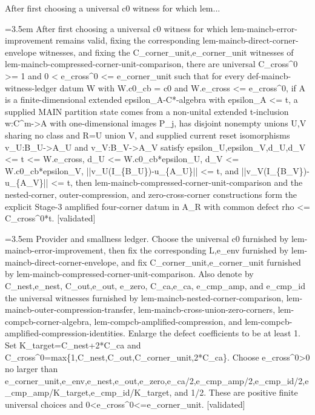 \documentclass{article}
\newcommand{\step}[1]{\par\noindent\hangindent=3.5em\hangafter=1%
  \makebox[3.5em][l]{\textbf{#1.}}}
\newcommand{\steptag}[1]{\hfill{\small\textsf{[#1]}}}
\begin{document}
\begin{proofbox}{After first choosing a universal c0 witness for which lem...}
\step{1} After first choosing a universal c0 witness for which lem-maincb-error-improvement remains valid, fixing the corresponding lem-maincb-direct-corner-envelope witnesses, and fixing the C\_corner\_unit,e\_corner\_unit witnesses of lem-maincb-compressed-corner-unit-comparison, there are universal C\_cross\textasciicircum{}0 >= 1 and 0 < e\_cross\textasciicircum{}0 <= e\_corner\_unit such that for every def-maincb-witness-ledger datum W with W.c0\_cb = c0 and W.e\_cross <= e\_cross\textasciicircum{}0, if A is a finite-dimensional extended epsilon\_A-C*-algebra with epsilon\_A <= t, a supplied MAIN partition state comes from a non-unital extended t-inclusion w:C\textasciicircum{}m->A with one-dimensional images P\_j, has disjoint nonempty unions U,V sharing no class and R=U union V, and supplied current reset isomorphisms v\_U:B\_U->A\_U and v\_V:B\_V->A\_V satisfy epsilon\_U,epsilon\_V,d\_U,d\_V <= t <= W.e\_cross, d\_U <= W.c0\_cb*epsilon\_U, d\_V <= W.c0\_cb*epsilon\_V, ||v\_U(I\_\{B\_U\})-u\_\{A\_U\}|| <= t, and ||v\_V(I\_\{B\_V\})-u\_\{A\_V\}|| <= t, then lem-maincb-compressed-corner-unit-comparison and the nested-corner, outer-compression, and zero-cross-corner constructions form the explicit Stage-3 amplified four-corner datum in A\_R with common defect rho <= C\_cross\textasciicircum{}0*t. \steptag{validated} \\[6pt]
\step{1.1} Provider and smallness ledger. Choose the universal c0 furnished by lem-maincb-error-improvement, then fix the corresponding L,e\_env furnished by lem-maincb-direct-corner-envelope, and fix C\_corner\_unit,e\_corner\_unit furnished by lem-maincb-compressed-corner-unit-comparison. Also denote by C\_nest,e\_nest, C\_out,e\_out, e\_zero, C\_ca,e\_ca, e\_cmp\_amp, and e\_cmp\_id the universal witnesses furnished by lem-maincb-nested-corner-comparison, lem-maincb-outer-compression-transfer, lem-maincb-cross-union-zero-corners, lem-compcb-corner-algebra, lem-compcb-amplified-compression, and lem-compcb-amplified-compression-identities. Enlarge the defect coefficients to be at least 1. Set K\_target=C\_nest+2*C\_ca and C\_cross\textasciicircum{}0=max\{1,C\_nest,C\_out,C\_corner\_unit,2*C\_ca\}. Choose e\_cross\textasciicircum{}0>0 no larger than e\_corner\_unit,e\_env,e\_nest,e\_out,e\_zero,e\_ca/2,e\_cmp\_amp/2,e\_cmp\_id/2,e\_cmp\_amp/K\_target,e\_cmp\_id/K\_target, and 1/2. These are positive finite universal choices and 0<e\_cross\textasciicircum{}0<=e\_corner\_unit. \steptag{validated} \\[4pt]

\end{proofbox}
\end{document}
